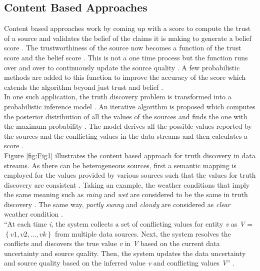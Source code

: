 \documentclass[sigconf]{acmart}
\begin{document}
\subsection{Content Based Approaches}
Content based approaches work by coming up with a score to compute the trust of a source and validates the belief of the claims it is making to generate a belief score \cite{Berti-Equille2016}. The trustworthiness of the source now becomes a function of the trust score and the belief score \cite{Berti-Equille2016}. This is not a one time process but the function runs over and over to continuously update the source quality \cite{Berti-Equille2016}. A few probabilistic methods are added to this function to improve the accuracy of the score which extends the algorithm beyond just trust and belief \cite{Berti-Equille2016}. \\ In one such application, the truth discovery problem is transformed into a probabilistic inference model \cite{Zhao2014}. An iterative algorithm is proposed which computes the posterior distribution of all the values of the sources and finds the one with the maximum probability \cite{Zhao2014}. The model derives all the possible values reported by the sources and the conflicting values in the data streams and then calculates a score \cite{Zhao2014}. \\
Figure \ref{fig:Fig1} illustrates the content based approach for truth discovery in data streams. As there can be heterogeneous sources, first a semantic mapping is employed for the values provided by various sources such that the values for truth discovery are consistent \cite{Zhao2014}. Taking an example, the weather conditions that imply the same meaning such as {\em rainy} and {\em wet} are considered to be the same in truth discovery \cite{Zhao2014}. The same way, {\em partly sunny} and {\em cloudy} are considered as {\em clear} weather condition \cite{Zhao2014}. \\
``At each time {\em i}, the system collects a set of conflicting
values for entity {\em v} as {\em V} = $\left\{{v1,v2,...,vk}\right\}$ from multiple data sources. Next, the system resolves the conflicts and discovers the true value {\em v} in {\em V} based on the current data uncertainty and source quality. Then, the system updates the data uncertainty and source quality based on the inferred value {\em v} and conflicting values {\em V}'' \cite{Zhao2014}.
\end{document}
